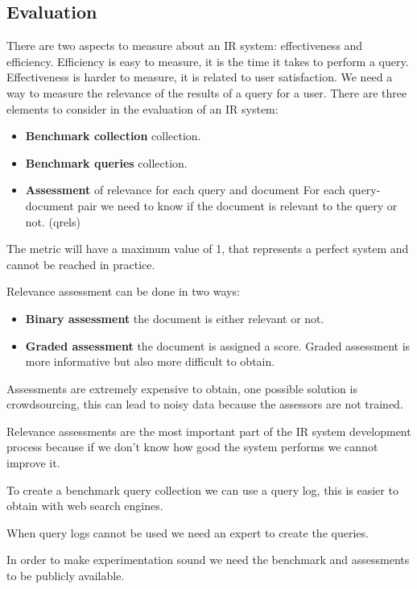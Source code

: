 \subsection{Evaluation}
\label{sec:evaluation}

There are two aspects to measure about an IR system: effectiveness and efficiency.
Efficiency is easy to measure, it is the time it takes to perform a query.
Effectiveness is harder to measure, it is related to user satisfaction.
We need a way to measure the relevance of the results of a query for
a user.
There are three elements to consider in the evaluation of an IR system:
\begin{itemize}
    \item \textbf{Benchmark collection} collection.
    \item \textbf{Benchmark queries} collection.
    \item \textbf{Assessment} of relevance for each query and document
    For each query-document pair we need to know if the document is relevant
    to the query or not. (qrels)
\end{itemize}

The metric will have a maximum value of 1, that represents a perfect system and
cannot be reached in practice.

Relevance assessment can be done in two ways:
\begin{itemize}
    \item \textbf{Binary assessment} the document is either relevant or not.
    \item \textbf{Graded assessment} the document is assigned a score.
    Graded assessment is more informative but also more difficult to obtain.
\end{itemize}

Assessments are extremely expensive to obtain, one possible solution is crowdsourcing,
this can lead to noisy data because the assessors are not trained.

Relevance assessments are the most important part of the IR system development process
because if we don't know how good the system performs we cannot improve it.

To create a benchmark query collection we can use a query log, this is easier to obtain
with web search engines.

When query logs cannot be used we need an expert to create the queries.

In order to make experimentation sound we need the benchmark and assessments to be
publicly available.

